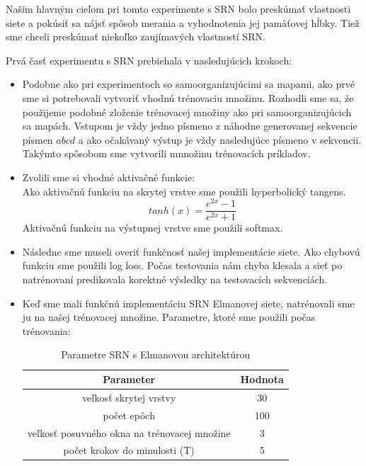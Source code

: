 Naším hlavným cieľom pri tomto experimente s SRN bolo preskúmať vlastnosti siete a pokúsiť sa nájsť 
spôsob merania a vyhodnotenia jej pamäťovej hĺbky. 
Tiež sme chceli preskúmať niekoľko zaujímavých vlastností SRN.

Prvá časť experimentu s SRN prebiehala v nasledujúcich krokoch:
\begin{itemize}
    \item Podobne ako pri experimentoch so samoorganizujúcimi sa mapami, ako prvé sme si potrebovali vytvoriť vhodnú trénovaciu množinu.
     Rozhodli sme sa, že použijeme podobné zloženie trénovacej množiny ako pri samoorganizujúcich sa mapách.
     Vstupom je vždy jedno písmeno z náhodne generovanej sekvencie písmen $abcd$ a ako očakávaný výstup je vždy nasledujúce písmeno v sekvencii.
     Takýmto spôsobom sme vytvorili mnnožinu trénovacích príkladov.
     \item Zvolili sme si vhodné aktivačné funkcie:  \\
     Ako aktivačnú funkciu na skrytej vrstve sme použili hyperbolický tangens.
     \begin{equation}
         tanh(x) = \frac{e^{2x} - 1}{e^{2x} + 1}
     \end{equation}
     Aktivačnú funkciu na výstupnej vrstve sme použili softmax. 
     \item Následne sme museli overiť funkčnosť našej implementácie siete. Ako chybovú funkciu sme použili log loss.
    Počas testovania nám chyba klesala a sieť po natrénovaní predikovala korektné výsledky na testovacích sekvenciách.
     \item Keď sme mali funkčnú implementáciu SRN Elmanovej siete, natrénovali sme ju na našej trénovacej množine.
     Parametre, ktoré sme použili počas trénovania: \\
    \begin{table}[h!]
        \centering
        \begin{tabular}{|c|c|} 
        \hline
        Parameter & Hodnota \\ 
        \hline
        veľkosť skrytej vrstvy & 30  \\
        \hline
        počet epôch & 100  \\
        \hline
        veľkosť posuvného okna na trénovacej množine & 3  \\
        \hline
        počet krokov do minulosti (T) & 5 \\
        \hline
        \end{tabular}
        \caption{Parametre SRN s Elmanovou architektúrou}
        \label{table:1}
    \end{table}
\end{itemize}

